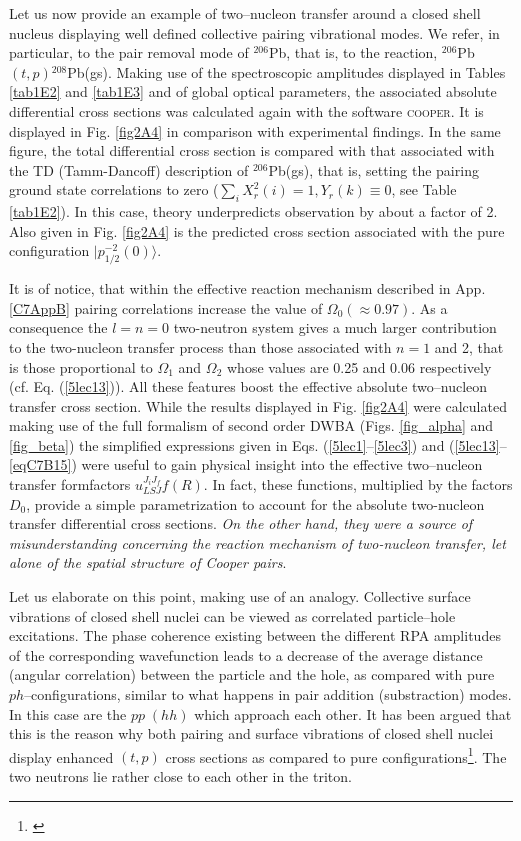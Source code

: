 Let us now provide an example of two--nucleon transfer around a closed shell nucleus displaying well defined collective pairing vibrational modes. We refer, in particular, to the pair removal mode of $^{206}$Pb, that is, to the reaction, $^{206}$Pb$(t,p)$$^{208}$Pb(gs). Making use of the spectroscopic amplitudes displayed in Tables \ref{tab1E2} and \ref{tab1E3} and of global optical parameters, the associated  absolute differential cross sections was calculated again with the software \textsc{cooper}. It is displayed in Fig. \ref{fig2A4} in comparison with experimental findings. In  the same figure, the total differential cross section is compared with that associated with the TD (Tamm-Dancoff) description of $^{206}$Pb(gs), that is, setting the pairing ground state correlations to zero ($\sum_i X^2_r(i)=1, Y_r(k)\equiv 0$, see Table \ref{tab1E2}). In this case, theory underpredicts observation by about a factor of 2.  Also given in Fig. \ref{fig2A4} is the predicted cross section associated with the pure configuration $|p_{1/2}^{-2}(0)\rangle$. 


It is of notice, that within the effective reaction mechanism described in App. \ref{C7AppB} pairing correlations increase the value of $\Omega_0(\approx 0.97)$. As a consequence the   $l=n=0$ two-neutron system gives a much larger contribution to the two-nucleon transfer process than those associated with $n=1$ and 2, that is those proportional to $\Omega_1$ and $\Omega_2$ whose values are 0.25 and 0.06 respectively (cf. Eq. (\ref{5lec13})). All these features boost the effective absolute two--nucleon  transfer cross section. While the results displayed in Fig. \ref{fig2A4} were calculated making use of the full formalism of second order DWBA (Figs. \ref{fig_alpha} and \ref{fig_beta}) the simplified expressions given in Eqs. (\ref{5lec1}--\ref{5lec3}) and (\ref{5lec13}--\ref{eqC7B15}) were useful to gain physical insight into the effective  two--nucleon transfer formfactors $u^{J_iJ_f}_{LSJ}f(R)$. In fact, these functions, multiplied by the factors $D_0$, provide a simple parametrization to account for the absolute two-nucleon transfer  differential cross sections. \emph{On the other hand, they were a source of misunderstanding concerning the reaction mechanism of two-nucleon transfer, let alone of the spatial structure of Cooper pairs}.


 Let us elaborate on this point, making use of an analogy. Collective surface vibrations of closed shell nuclei can be viewed as correlated particle--hole excitations. The phase coherence existing between the different RPA amplitudes of the corresponding wavefunction leads to a decrease of the average distance (angular correlation) between the particle and the hole, as compared with pure $ph$--configurations, similar to what happens in pair addition (substraction) modes. In this case are the $pp\;(hh)$ which approach each other. It has been argued that this is the reason why both pairing and surface vibrations of closed shell nuclei display enhanced $(t,p)$ cross sections as compared to pure configurations\footnote{\cite{Bertsch:67}}. The two neutrons lie rather close to each other in the triton.


